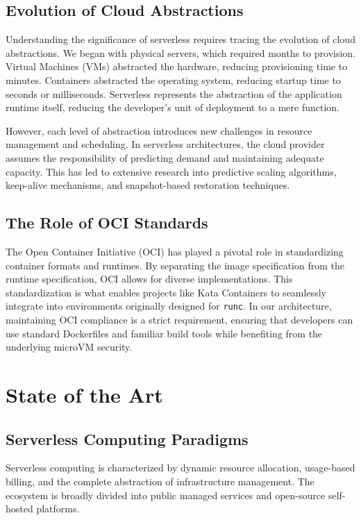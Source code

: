 \documentclass[12pt,a4paper]{report}
\begin{document}
\section{Evolution of Cloud Abstractions}
Understanding the significance of serverless requires tracing the evolution of cloud abstractions. We began with physical servers, which required months to provision. Virtual Machines (VMs) abstracted the hardware, reducing provisioning time to minutes. Containers abstracted the operating system, reducing startup time to seconds or milliseconds. Serverless represents the abstraction of the application runtime itself, reducing the developer's unit of deployment to a mere function.

However, each level of abstraction introduces new challenges in resource management and scheduling. In serverless architectures, the cloud provider assumes the responsibility of predicting demand and maintaining adequate capacity. This has led to extensive research into predictive scaling algorithms, keep-alive mechanisms, and snapshot-based restoration techniques.

\section{The Role of OCI Standards}
The Open Container Initiative (OCI) has played a pivotal role in standardizing container formats and runtimes. By separating the image specification from the runtime specification, OCI allows for diverse implementations. This standardization is what enables projects like Kata Containers to seamlessly integrate into environments originally designed for \texttt{runc}. In our architecture, maintaining OCI compliance is a strict requirement, ensuring that developers can use standard Dockerfiles and familiar build tools while benefiting from the underlying microVM security.

\chapter{State of the Art}

\section{Serverless Computing Paradigms}
Serverless computing is characterized by dynamic resource allocation, usage-based billing, and the complete abstraction of infrastructure management. The ecosystem is broadly divided into public managed services and open-source self-hosted platforms.
\end{document}
